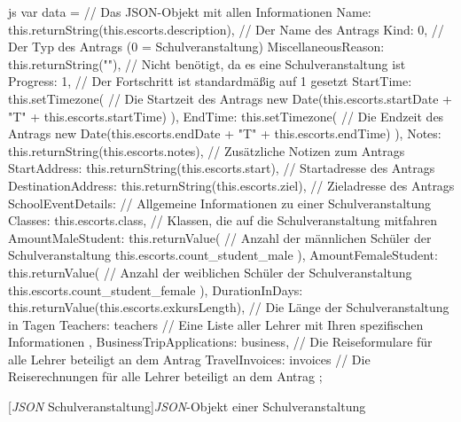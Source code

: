 \begin{code}{js}
var data = {		// Das JSON-Objekt mit allen Informationen
	Name: this.returnString(this.escorts.description),	// Der Name des Antrags
	Kind: 0,	// Der Typ des Antrags (0 = Schulveranstaltung)
	MiscellaneousReason: this.returnString(""),			// Nicht benötigt, da es eine Schulveranstaltung ist
	Progress: 1,	// Der Fortschritt ist standardmäßig auf 1 gesetzt
	StartTime: this.setTimezone(	// Die Startzeit des Antrags
	new Date(this.escorts.startDate + "T" + this.escorts.startTime)
	),
	EndTime: this.setTimezone(	// Die Endzeit des Antrags
	new Date(this.escorts.endDate + "T" + this.escorts.endTime)
	),
	Notes: this.returnString(this.escorts.notes),	// Zusätzliche Notizen zum Antrags
	StartAddress: this.returnString(this.escorts.start),	// Startadresse des Antrags
	DestinationAddress: this.returnString(this.escorts.ziel), // Zieladresse des Antrags
	SchoolEventDetails: {	// Allgemeine Informationen zu einer Schulveranstaltung
		Classes: this.escorts.class,	// Klassen, die auf die Schulveranstaltung mitfahren
		AmountMaleStudent: this.returnValue(	// Anzahl der männlichen Schüler der Schulveranstaltung
		this.escorts.count_student_male
		),
		AmountFemaleStudent: this.returnValue(	// Anzahl der weiblichen Schüler der Schulveranstaltung
		this.escorts.count_student_female
		),
		DurationInDays: this.returnValue(this.escorts.exkursLength),	// Die Länge der Schulveranstaltung in Tagen
		Teachers: teachers	// Eine Liste aller Lehrer mit Ihren spezifischen Informationen
	},
	BusinessTripApplications: business,	// Die Reiseformulare für alle Lehrer beteiligt an dem Antrag
	TravelInvoices: invoices	// Die Reiserechnungen für alle Lehrer beteiligt an dem Antrag
};
\end{code}
[\textit{JSON} Schulveranstaltung]{\textit{JSON}-Objekt einer Schulveranstaltung}~\\
\newpage
